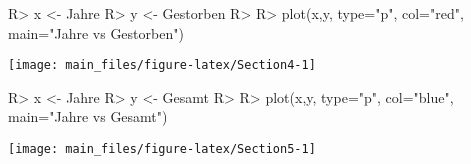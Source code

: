 \documentclass[article]{jss}
\begin{document}
\begin{CodeChunk}

\begin{CodeInput}
R> x <- Jahre
R> y <- Gestorben
R> 
R> plot(x,y, type="p", col="red", main="Jahre vs Gestorben")
\end{CodeInput}


\begin{center}\texttt{[image: main\_files/figure-latex/Section4-1]} \end{center}

\end{CodeChunk}
\begin{CodeChunk}

\begin{CodeInput}
R> x <- Jahre
R> y <- Gesamt
R> 
R> plot(x,y, type="p", col="blue", main="Jahre vs Gesamt")
\end{CodeInput}


\begin{center}\texttt{[image: main\_files/figure-latex/Section5-1]} \end{center}

\end{CodeChunk}
\end{document}
